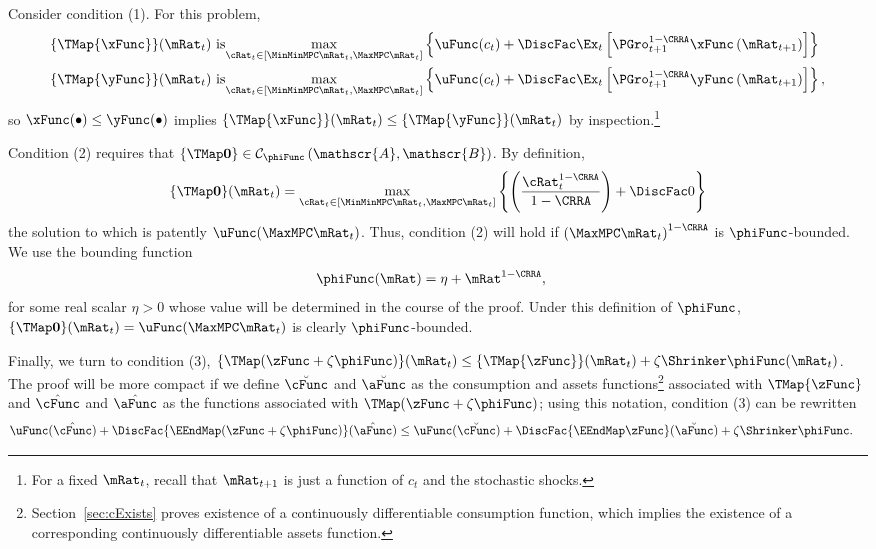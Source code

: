 \documentclass[\econtexRoot/BufferStockTheory]{subfiles}
\begin{document}
Consider condition (1). For this problem,
\begin{align*}
\{\TMap{\mathfrak{\xFunc}}\}(\mRat_{t}) &\mbox{~is}\underset{\cRat_{t} \in
[\MinMinMPC \mRat_{t}, \MaxMPC \mRat_{t}]
}\max \left\{
\uFunc(c_{t})+\DiscFac \Ex_{t}\left[ {\PGro}_{t+1}^{1-\CRRA }{\mathfrak{\xFunc}}
\left( {\mRat}_{t+1}\right) \right] \right\}  \notag  \label{eq:condition1}
\\
\{\TMap{\mathfrak{\yFunc}}\}(\mRat_{t}) &\mbox{~is}\underset{\cRat_{t} \in
[\MinMinMPC \mRat_{t}, \MaxMPC \mRat_{t}]
}\max \left\{
\uFunc(c_{t})+\DiscFac \Ex_{t}\left[ {\PGro}_{t+1}^{1-\CRRA }{\mathfrak{\yFunc}}
\left( {\mRat}_{t+1}\right) \right] \right\} ,  \notag
\end{align*}%
so ${\mathfrak{\xFunc}}(\bullet) \leq {\mathfrak{\yFunc}}(\bullet)$ implies $\{\TMap{\mathfrak{\xFunc}}\}(\mRat_{t}) \leq \{\TMap{\mathfrak{\yFunc}} \}(\mRat_{t})$ by inspection.\footnote{For a fixed $\mRat_{t}$, recall that ${\mRat}_{t+1}$ is just a function of $c_{t}$ and the
stochastic shocks.}

Condition (2) requires that $\{\TMap\mathbf{0}\}\in \mathcal{C}_{\phiFunc}\left(\mathscr{A},\mathscr{B}\right)$. By definition,
\begin{equation*}
\{\TMap \mathbf{0}\}(\mRat_{t}) = \max_{\cRat_{t} \in
[\MinMinMPC \mRat_{t}, \MaxMPC \mRat_{t}]
}\left\{ \left( \frac{\cRat_{t}^{1-\CRRA }}{1-\CRRA }\right) +\DiscFac 0\right\}
\end{equation*}
the solution to which is patently
$\uFunc(\MaxMPC \mRat_{t})$. Thus, condition (2)
will hold if ${(\MaxMPC \mRat_{t})}^{1-\CRRA}$ is $\phiFunc$-bounded.  We use
the bounding function
\begin{equation}\begin{gathered}\begin{aligned}
  \label{eq:phiFunc}
  \phiFunc(\mRat)  & = \eta + \mRat^{1-\CRRA},
\end{aligned}\end{gathered}\end{equation}
for some real scalar $\eta > 0$ whose value will be determined in the
course of the proof. Under this definition of $\phiFunc$,
$\{\TMap\mathbf{0}\}(\mRat_{t})= \uFunc(\MaxMPC \mRat_{t})$
is clearly
$\phiFunc$-bounded.

Finally, we turn to condition (3), $\{\TMap({\zFunc} +\zeta\phiFunc
)\}(\mRat_{t}) \leq \{\TMap{\zFunc}\}(\mRat_{t}) +\zeta \Shrinker
\phiFunc(\mRat_{t})$. The proof will be more compact if we define
$\breve{\cFunc}$ and $\breve{\aFunc}$ as the consumption and assets
functions\footnote{Section~\ref{sec:cExists} proves existence of a
  continuously differentiable consumption function, which implies the
  existence of a corresponding continuously differentiable assets
  function.}  associated with $\TMap{\zFunc}$ and $\hat{\cFunc}$ and
$\hat{\aFunc}$ as the functions associated with $\TMap({\zFunc+\zeta
  \phiFunc})$; using this notation, condition (3) can be rewritten
\begin{align*}
\uFunc(\hat{\cFunc})+\DiscFac \{\EEndMap (\zFunc+\zeta \phiFunc) \}(\hat{\aFunc})  & \leq  \uFunc(\breve{\cFunc})+\DiscFac \{\EEndMap \zFunc \}(\breve{\aFunc})  + \zeta \Shrinker \phiFunc.
\end{align*}
\end{document}

